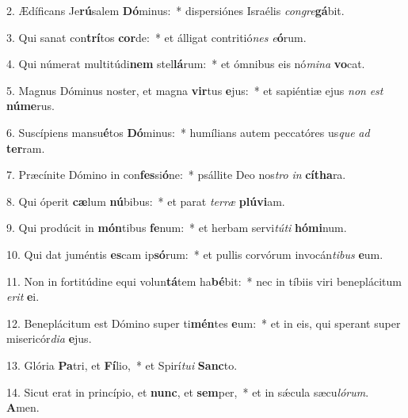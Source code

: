 2. Ædíficans Je\textbf{rú}salem \textbf{Dó}minus:~*  dispersiónes Israélis \textit{con}\textit{gre}\textbf{gá}bit.\

3. Qui sanat con\textbf{trí}tos \textbf{cor}de:~*  et álligat contritió\textit{nes} \textit{e}\textbf{ó}rum.\

4. Qui númerat multitúdi\textbf{nem} stel\textbf{lá}rum:~*  et ómnibus eis nó\textit{mi}\textit{na} \textbf{vo}cat.\

5. Magnus Dóminus noster, et magna \textbf{vir}tus \textbf{e}jus:~*  et sapiéntiæ ejus \textit{non} \textit{est} \textbf{nú}\textbf{me}rus.\

6. Suscípiens mansu\textbf{é}tos \textbf{Dó}minus:~*  humílians autem peccatóres us\textit{que} \textit{ad} \textbf{ter}ram.\

7. Præcínite Dómino in con\textbf{fes}si\textbf{ó}ne:~*  psállite Deo nos\textit{tro} \textit{in} \textbf{cí}\textbf{tha}ra.\

8. Qui óperit \textbf{cæ}lum \textbf{nú}bibus:~*  et parat \textit{ter}\textit{ræ} \textbf{plú}\textbf{vi}am.\

9. Qui prodúcit in \textbf{món}tibus \textbf{fe}num:~*  et herbam servi\textit{tú}\textit{ti} \textbf{hó}\textbf{mi}num.\

10. Qui dat juméntis \textbf{es}cam ip\textbf{só}rum:~*  et pullis corvórum invocán\textit{ti}\textit{bus} \textbf{e}um.\

11. Non in fortitúdine equi volun\textbf{tá}tem ha\textbf{bé}bit:~*  nec in tíbiis viri beneplácitum \textit{e}\textit{rit} \textbf{e}i.\

12. Beneplácitum est Dómino super ti\textbf{mén}tes \textbf{e}um:~*  et in eis, qui sperant super misericór\textit{di}\textit{a} \textbf{e}jus.\

13. Glória \textbf{Pa}tri, et \textbf{Fí}lio,~*  et Spirí\textit{tu}\textit{i} \textbf{Sanc}to.\

14. Sicut erat in princípio, et \textbf{nunc}, et \textbf{sem}per,~*  et in sǽcula sæcu\textit{ló}\textit{rum}. \textbf{A}men.\

